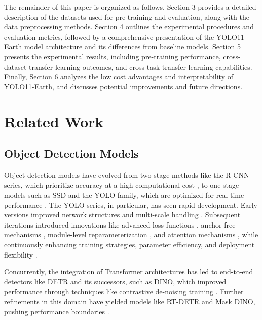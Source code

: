\documentclass{article}
\begin{document}
The remainder of this paper is organized as follows. 
Section 3 provides a detailed description of the datasets used for pre-training and evaluation, 
along with the data preprocessing methods. 
Section 4 outlines the experimental procedures and evaluation metrics, followed by a comprehensive 
presentation of the YOLO11-Earth model architecture and its differences from baseline models. 
Section 5 presents the experimental results, including pre-training performance, cross-dataset 
transfer learning outcomes, and cross-task transfer learning capabilities. 
Finally, Section 6 analyzes the low cost advantages and interpretability of YOLO11-Earth, 
and discusses potential improvements and future directions. 


\section{Related Work}

\subsection{Object Detection Models}
Object detection models have evolved from two-stage methods 
like the R-CNN series, which prioritize accuracy at a high 
computational cost \cite{girshick2014rich,girshick2015fast,ren2016faster,he2017mask}, 
to one-stage models such as SSD and the YOLO family, which are 
optimized for real-time performance \cite{liu2016ssd,redmon2016you}. 
The YOLO series, in particular, has seen rapid development. 
Early versions improved network structures and multi-scale 
handling \cite{redmon2017yolo9000, redmon2018yolov3}. 
Subsequent iterations introduced innovations like advanced 
loss functions \cite{bochkovskiy2020yolov4}, anchor-free 
mechanisms \cite{li2022yolov6}, module-level reparameterization 
\cite{wang2023yolov7}, and attention mechanisms \cite{tian2025yolov12}, 
while continuously enhancing training strategies, parameter 
efficiency, and deployment flexibility \cite{jocher2020ultralytics, 
sohan2024review, wang2024yolov9, wang2024yolov10, khanam2024yolov11}.

Concurrently, the integration of Transformer architectures has 
led to end-to-end detectors like DETR \cite{carion2020end} and 
its successors, such as DINO, which improved performance through 
techniques like contrastive de-noising training \cite{zhang2022dino}. 
Further refinements in this domain have yielded models like 
RT-DETR and Mask DINO, pushing performance boundaries 
\cite{li2023mask, zhao2024detrs, lv2024rt}. 
\end{document}
